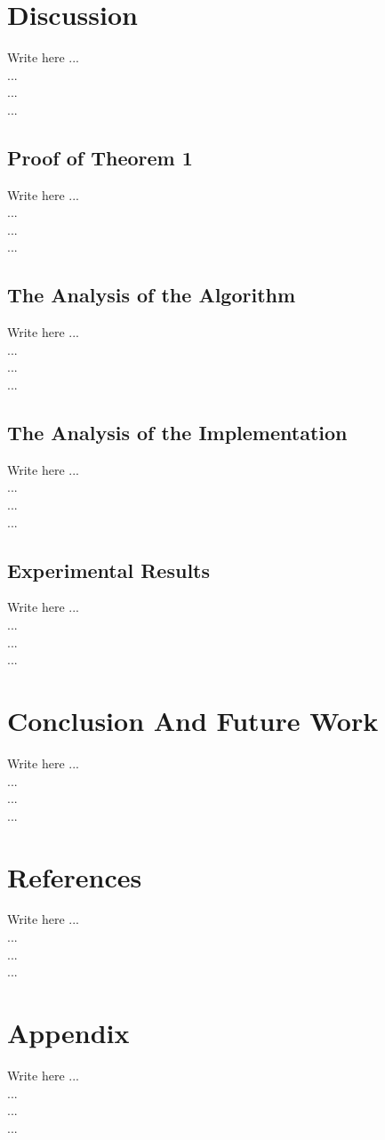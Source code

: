 \documentclass[conference]{IEEEtran}
\begin{document}
\section{Discussion}

    Write here ... \\
    ...  \\
    ...  \\
    ...  
\subsection*{Proof of Theorem 1}
    Write here ... \\
    ...  \\
    ...  \\
    ...  
    
\subsection{The Analysis of the Algorithm}\label{AA}
    Write here ... \\
    ...  \\
    ...  \\
    ...  

\subsection{The Analysis of the Implementation}
    Write here ... \\
    ...  \\
    ...  \\
    ...  
\subsection{Experimental Results}
    Write here ... \\
    ...  \\
    ...  \\
    ...     


\section{Conclusion And Future Work}
    Write here ... \\
    ...  \\
    ...  \\
    ...   
    
\section*{References}
    Write here ... \\
    ...  \\
    ...  \\
    ...  
    
\section*{Appendix}
    Write here ... \\
    ...  \\
    ...  \\
    ...  
\end{document}
